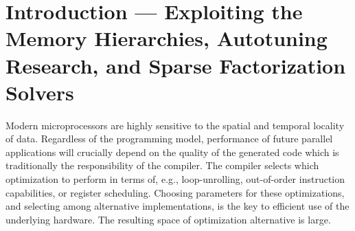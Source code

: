 %
%
%

\section[Introduction --- Memory Hierarchies, Autotuning, and Solvers]{Introduction --- Exploiting the Memory Hierarchies, Autotuning Research, and Sparse Factorization Solvers}
\label{sec:modeling-intro}

Modern microprocessors are highly sensitive to the spatial and temporal locality of data. Regardless of the programming model, performance of future parallel applications will crucially depend on the quality of the generated code which is traditionally the responsibility of the compiler. The compiler selects which optimization to perform in terms of, e.g., loop-unrolling, out-of-order instruction capabilities, or register scheduling. Choosing parameters for these optimizations, and selecting among alternative implementations, is the key to efficient use of the underlying hardware. The resulting space of optimization alternative is large.

